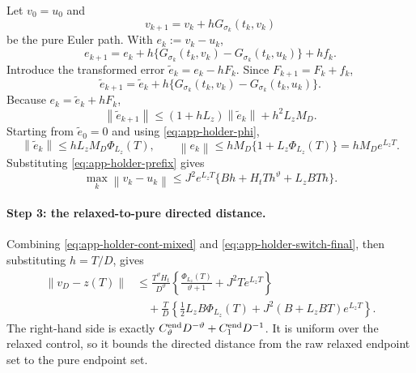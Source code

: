 \documentclass[twoside,11pt]{article}
\newcommand{\norm}[1]{\left\lVert #1\right\rVert}
\begin{document}
Let $v_0=u_0$ and
\begin{equation}
 v_{k+1}=v_k+hG_{\sigma_k}(t_k,v_k)
 \label{eq:app-holder-pure}
\end{equation}
be the pure Euler path.  With $e_k:=v_k-u_k$,
\begin{equation}
 e_{k+1}=e_k+h\{G_{\sigma_k}(t_k,v_k)
                    -G_{\sigma_k}(t_k,u_k)\}+hf_k.
 \label{eq:app-holder-e-rec}
\end{equation}
Introduce the transformed error $\widetilde e_k=e_k-hF_k$.  Since
$F_{k+1}=F_k+f_k$,
\begin{equation}
 \widetilde e_{k+1}
 =\widetilde e_k+h\{G_{\sigma_k}(t_k,v_k)
                         -G_{\sigma_k}(t_k,u_k)\}.
 \label{eq:app-holder-transformed-exact}
\end{equation}
Because $e_k=\widetilde e_k+hF_k$,
\begin{equation}
 \norm{\widetilde e_{k+1}}
 \le(1+hL_z)\norm{\widetilde e_k}+h^2L_zM_D.
 \label{eq:app-holder-transformed-bound}
\end{equation}
Starting from $\widetilde e_0=0$ and using
\eqref{eq:app-holder-phi},
\begin{equation}
 \norm{\widetilde e_k}\le hL_zM_D\Phi_{L_z}(T),
 \qquad
 \norm{e_k}\le hM_D\{1+L_z\Phi_{L_z}(T)\}
              =hM_De^{L_zT}.
 \label{eq:app-holder-mixed-pure}
\end{equation}
Substituting \eqref{eq:app-holder-prefix} gives
\begin{equation}
 \max_k\norm{v_k-u_k}
 \le J^2e^{L_zT}
 \{Bh+H_tT h^\vartheta+L_zBT h\}.
 \label{eq:app-holder-switch-final}
\end{equation}

\paragraph{Step 3: the relaxed-to-pure directed distance.}
Combining \eqref{eq:app-holder-cont-mixed} and
\eqref{eq:app-holder-switch-final}, then substituting $h=T/D$, gives
\begin{align}
 \norm{v_D-z(T)}
 &\le \frac{T^\vartheta H_t}{D^\vartheta}
       \left\{\frac{\Phi_{L_z}(T)}{\vartheta+1}
                    +J^2Te^{L_zT}\right\}\nonumber\\
 &\quad+\frac{T}{D}
       \left\{\frac12L_zB\Phi_{L_z}(T)
                    +J^2(B+L_zBT)e^{L_zT}\right\}.
 \label{eq:app-holder-directed-rel-pure}
\end{align}
The right-hand side is exactly
$C_\vartheta^{\rm end}D^{-\vartheta}+C_1^{\rm end}D^{-1}$.
It is uniform over the relaxed control, so it bounds the directed distance
from the raw relaxed endpoint set to the pure endpoint set.
\end{document}
